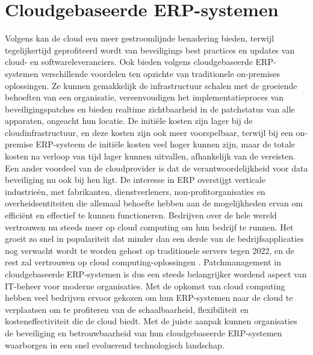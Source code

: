 \section{Cloudgebaseerde ERP-systemen}
Volgens \textcite{Forbes2021} kan de cloud een meer gestroomlijnde benadering bieden, terwijl tegelijkertijd geprofiteerd wordt van beveiligings best practices en updates van cloud- en softwareleveranciers. Ook bieden volgens \textcite{Ruiter2024}
cloudgebaseerde ERP-systemen verschillende voordelen ten opzichte van traditionele on-premises oplossingen. Ze kunnen gemakkelijk de infrastructuur schalen met de groeiende behoeften van een organisatie, 
vereenvoudigen het implementatieproces van beveiligingspatches en bieden realtime zichtbaarheid in de patchstatus van alle apparaten, ongeacht hun locatie. De initiële kosten zijn lager bij de cloudinfrastructuur, en
deze kosten zijn ook meer voorspelbaar, terwijl bij een on-premise ERP-systeem de initiële kosten veel hoger kunnen zijn, maar de
totale kosten na verloop van tijd lager kunnen uitvallen, afhankelijk van de vereisten. Een ander voordeel van de cloudprovider is dat
de verantwoordelijkheid voor data beveiliging nu ook bij hen ligt. De interesse in ERP
overstijgt verticale industrieën, met fabrikanten, dienstverleners, non-profitorganisaties en overheidsentiteiten die allemaal behoefte hebben aan de mogelijkheden ervan om efficiënt en effectief te kunnen
functioneren. Bedrijven over de hele wereld vertrouwen nu steeds meer op cloud computing om hun bedrijf te runnen. Het groeit zo snel in populariteit dat minder dan een derde van de bedrijfsapplicaties nog verwacht wordt 
te worden gehost op traditionele servers tegen 2022, en de rest zal vertrouwen op cloud computing-oplossingen \autocite{Pimentel2017}.
Patchmanagement in cloudgebaseerde ERP-systemen is dus een steeds belangrijker wordend aspect van IT-beheer voor moderne organisaties. Met de opkomst van cloud computing hebben veel bedrijven ervoor gekozen
om hun ERP-systemen naar de cloud te verplaatsen om te profiteren van de schaalbaarheid, flexibiliteit en kosteneffectiviteit die de cloud biedt. 
Met de juiste aanpak kunnen organisaties de beveiliging en betrouwbaarheid van hun cloudgebaseerde ERP-systemen waarborgen in een snel evoluerend technologisch landschap.

